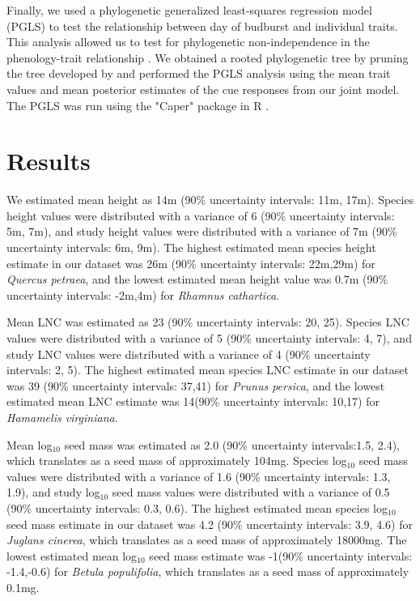 \documentclass{article}\usepackage[]{graphicx}\usepackage[]{color}
\begin{document}

Finally, we used a phylogenetic generalized least-squares regression model (PGLS) to test the relationship between day of budburst and individual traits. This analysis allowed us to test for phylogenetic non-independence in the phenology-trait relationship \citep{Freckleton2002}. We obtained a rooted phylogenetic tree by pruning the tree developed by \citep{Smith2018} and performed the PGLS analysis using the mean trait values and mean posterior estimates of the cue responses from our joint model. The PGLS was run using the "Caper" package in R \citep{Orne2013}. \\

\section{Results}

We estimated mean height as 14m (90\% uncertainty intervals: 11m, 17m). Species height values were distributed with a variance of 6 (90\% uncertainty intervals: 5m, 7m), and study height values were distributed with a variance of 7m (90\% uncertainty intervals: 6m, 9m). The highest estimated mean species height estimate in our dataset was 26m (90\% uncertainty intervals: 22m,29m) for \textit{Quercus petraea}, and the lowest estimated mean height value was 0.7m (90\% uncertainty intervals: -2m,4m) for \textit{Rhamnus cathartica}. 

Mean LNC was estimated as 23 (90\% uncertainty intervals: 20, 25). Species LNC values were distributed with a variance of 5 (90\% uncertainty intervals: 4, 7), and study LNC values were distributed with a variance of 4 (90\% uncertainty intervals: 2, 5). The highest estimated mean species LNC estimate in our dataset was 39 (90\% uncertainty intervals: 37,41) for \textit{Prunus persica}, and the lowest estimated mean LNC estimate was 14(90\% uncertainty intervals: 10,17) for \textit{Hamamelis virginiana}.

Mean log$_{10}$ seed mass was estimated as 2.0 (90\% uncertainty intervals:1.5, 2.4), which translates as a seed mass of approximately 104mg. Species log$_{10}$ seed mass values were distributed with a variance of 1.6 (90\% uncertainty intervals: 1.3, 1.9), and study log$_{10}$ seed mass values were distributed with a variance of 0.5 (90\% uncertainty intervals: 0.3, 0.6). The highest estimated mean species log$_{10}$ seed mass estimate in our dataset was 4.2 (90\% uncertainty intervals: 3.9, 4.6) for \textit{Juglans cinerea}, which translates as a seed mass of approximately 18000mg. The lowest estimated mean log$_{10}$ seed mass estimate was -1(90\% uncertainty intervals: -1.4,-0.6) for \textit{Betula populifolia}, which translates as a seed mass of approximately 0.1mg.
\end{document}
